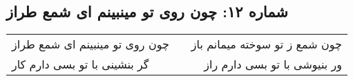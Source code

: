 \begin{center}
\section*{شماره ۱۲: چون روی تو مینبینم ای شمع طراز}
\label{sec:012}
\begin{longtable}{l p{0.5cm} r}
چون روی تو مینبینم ای شمع طراز
&&
چون شمع ز تو سوخته میمانم باز
\\
گر بنشینی با تو بسی دارم کار
&&
ور بنیوشی با تو بسی دارم راز
\\
\end{longtable}
\end{center}

